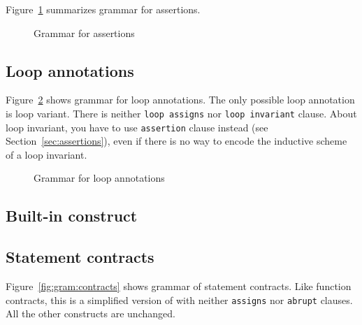 Figure~\ref{fig:gram:assertions} summarizes grammar for assertions.
\begin{figure}[htbp]
  \begin{cadre}
    
  \end{cadre}
  \caption{Grammar for assertions}
  \label{fig:gram:assertions}
\end{figure}


\subsection{Loop annotations}
\label{sec:loop_annot}


Figure~\ref{fig:gram:loops} shows grammar for loop annotations. The only
possible loop annotation is loop variant. There is neither
\lstinline|loop assigns| nor \lstinline|loop invariant| clause. About loop
invariant, you have to use \lstinline|assertion| clause instead (see
Section~\ref{sec:assertions}), even if there is no way to encode the inductive
scheme of a loop invariant.
\begin{figure}[htbp]
  \begin{cadre}
    
  \end{cadre}
  \caption{Grammar for loop annotations}
  \label{fig:gram:loops}
\end{figure}


\subsection{Built-in construct \texorpdfstring{\at}{\textbackslash{}at}}
\label{sec:at}
\nodiff


\subsection{Statement contracts}
\label{sec:statement_contract}


Figure~\ref{fig:gram:contracts} shows grammar of statement contracts. Like
function contracts, this is a simplified version of \acsl with neither
\lstinline|assigns| nor \lstinline|abrupt| clauses. 
All the other constructs are unchanged.

